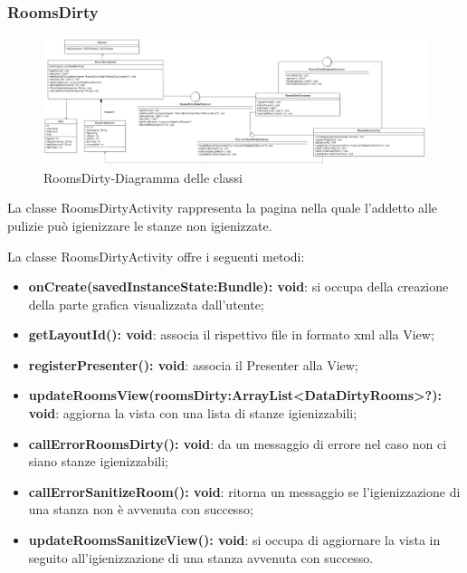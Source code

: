 \subsubsection{RoomsDirty}
\begin{figure}[H]
	\centering
	\includegraphics[width=16cm]{res/images/RoomsDirty.png}
	\caption{RoomsDirty-Diagramma delle classi}
	\label{fig:RoomsDirty-Diagramma delle classi}
\end{figure}
La classe RoomsDirtyActivity rappresenta la pagina nella quale l'addetto alle pulizie può igienizzare le stanze non igienizzate.

La classe RoomsDirtyActivity offre i seguenti metodi:
\begin{itemize}
	\item \textbf{onCreate(savedInstanceState:Bundle): void}: si occupa della creazione della parte grafica visualizzata dall'utente; 
	\item \textbf{getLayoutId(): void}: associa il rispettivo file in formato xml alla View;
	\item \textbf{registerPresenter(): void}: associa il Presenter alla View; 
	\item \textbf{updateRoomsView(roomsDirty:ArrayList<DataDirtyRooms>?): void}: aggiorna la vista con una lista di stanze igienizzabili; 
	\item \textbf{callErrorRoomsDirty(): void}: da un messaggio di errore nel caso non ci siano stanze igienizzabili;
	\item \textbf{callErrorSanitizeRoom(): void}: ritorna un messaggio se l'igienizzazione di una stanza non è avvenuta con successo; 
	\item \textbf{updateRoomsSanitizeView(): void}: si occupa di aggiornare la vista in seguito all'igienizzazione di una stanza avvenuta con successo.
\end{itemize}


